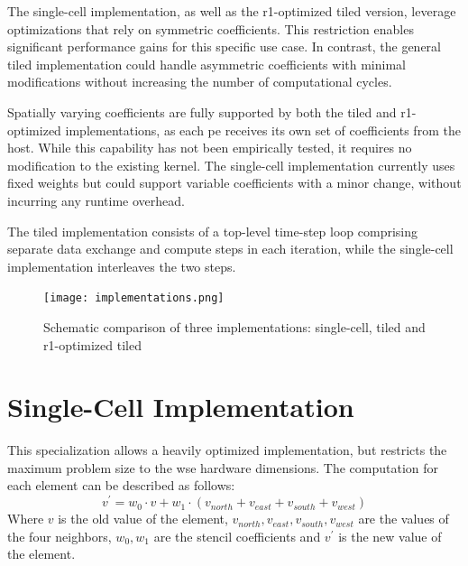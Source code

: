 The single-cell implementation, as well as the r1-optimized tiled version, leverage optimizations that rely on symmetric coefficients. This restriction enables significant performance gains for this specific use case. In contrast, the general tiled implementation could handle asymmetric coefficients with minimal modifications without increasing the number of computational cycles.

Spatially varying coefficients are fully supported by both the tiled and r1-optimized implementations, as each \ac{pe} receives its own set of coefficients from the host. While this capability has not been empirically tested, it requires no modification to the existing kernel. The single-cell implementation currently uses fixed weights but could support variable coefficients with a minor change, without incurring any runtime overhead.

The tiled implementation consists of a top-level time-step loop comprising separate data exchange and compute steps in each iteration, while the single-cell implementation interleaves the two steps.

\begin{figure}
    \centering
    \texttt{[image: implementations.png]}
    \caption{Schematic comparison of three implementations: single-cell, tiled and r1-optimized tiled}
    \label{fig:implementations}
\end{figure}

\section{Single-Cell Implementation}
This specialization allows a heavily optimized implementation, but restricts the maximum problem size to the \ac{wse} hardware dimensions.
The computation for each element can be described as follows:
\begin{equation}
    \label{eq:stencil_computation}
    v^{'} = w_0 \cdot v + w_1 \cdot (v_{north} + v_{east} + v_{south} + v_{west})
\end{equation}
Where $v$ is the old value of the element, $v_{north}, v_{east}, v_{south}, v_{west}$ are the values of the four neighbors, $w_0, w_1$ are the stencil coefficients and $v^{'}$ is the new value of the element.

